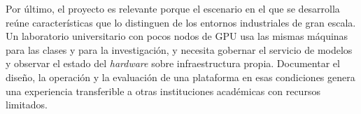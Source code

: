 Por último, el proyecto es relevante porque el escenario en el que se desarrolla reúne características que lo distinguen de los entornos industriales de gran escala. Un laboratorio universitario con pocos nodos de GPU usa las mismas máquinas para las clases y para la investigación, y necesita gobernar el servicio de modelos y observar el estado del \emph{hardware} sobre infraestructura propia. Documentar el diseño, la operación y la evaluación de una plataforma en esas condiciones genera una experiencia transferible a otras instituciones académicas con recursos limitados.
